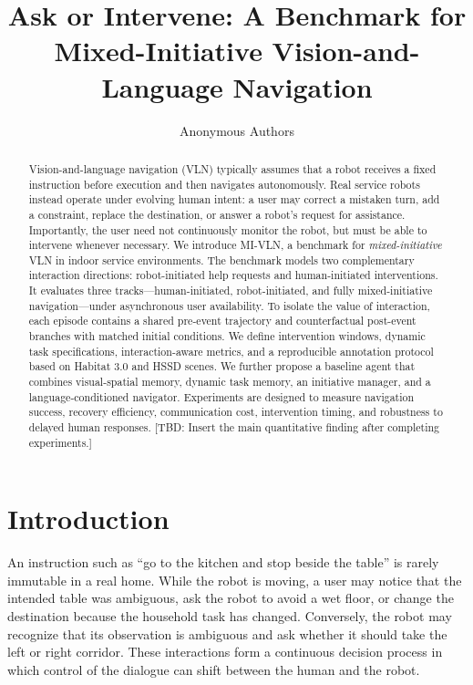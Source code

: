 \documentclass[10pt]{article}
\title{\textbf{Ask or Intervene: A Benchmark for\\
Mixed-Initiative Vision-and-Language Navigation}}
\author{Anonymous Authors}
\date{}
\newcommand{\method}{MI-VLN}
\newcommand{\tbd}[1]{\textcolor{red!75!black}{[TBD: #1]}}
\begin{document}
\maketitle

\begin{abstract}
Vision-and-language navigation (VLN) typically assumes that a robot receives
a fixed instruction before execution and then navigates autonomously.
Real service robots instead operate under evolving human intent: a user may
correct a mistaken turn, add a constraint, replace the destination, or answer
a robot's request for assistance. Importantly, the user need not continuously
monitor the robot, but must be able to intervene whenever necessary.
We introduce \method, a benchmark for \emph{mixed-initiative} VLN in indoor
service environments. The benchmark models two complementary interaction
directions: robot-initiated help requests and human-initiated interventions.
It evaluates three tracks---human-initiated, robot-initiated, and fully
mixed-initiative navigation---under asynchronous user availability.
To isolate the value of interaction, each episode contains a shared pre-event
trajectory and counterfactual post-event branches with matched initial
conditions. We define intervention windows, dynamic task specifications,
interaction-aware metrics, and a reproducible annotation protocol based on
Habitat 3.0 and HSSD scenes. We further propose a baseline agent that combines
visual-spatial memory, dynamic task memory, an initiative manager, and a
language-conditioned navigator. Experiments are designed to measure navigation
success, recovery efficiency, communication cost, intervention timing, and
robustness to delayed human responses. \tbd{Insert the main quantitative
finding after completing experiments.}
\end{abstract}

\section{Introduction}
\label{sec:intro}

An instruction such as ``go to the kitchen and stop beside the table'' is
rarely immutable in a real home. While the robot is moving, a user may notice
that the intended table was ambiguous, ask the robot to avoid a wet floor, or
change the destination because the household task has changed. Conversely, the
robot may recognize that its observation is ambiguous and ask whether it
should take the left or right corridor. These interactions form a continuous
decision process in which control of the dialogue can shift between the human
and the robot.
\end{document}

